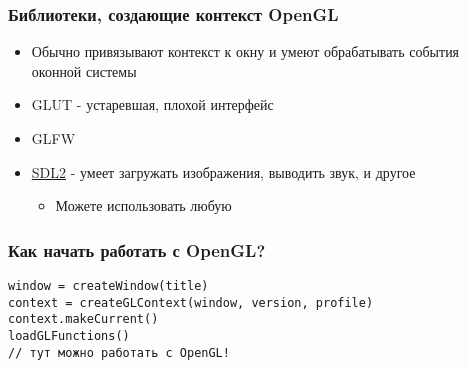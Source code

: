 \documentclass{beamer}
\begin{document}
\begin{frame}
\frametitle{Библиотеки, создающие контекст OpenGL}
\begin{itemize}
\item Обычно привязывают контекст к окну и умеют обрабатывать события оконной системы
\item GLUT - устаревшая, плохой интерфейс
\item GLFW
\item {\color{blue}\underline{SDL2}} - умеет загружать изображения, выводить звук, и другое
\begin{itemize}
\item Можете использовать любую
\end{itemize}
\end{itemize}
\end{frame}

\begin{frame}[fragile]
\frametitle{Как начать работать с OpenGL?}
\begin{verbatim}
window = createWindow(title)
context = createGLContext(window, version, profile)
context.makeCurrent()
loadGLFunctions()
// тут можно работать с OpenGL!
\end{verbatim}
\end{frame}
\end{document}
